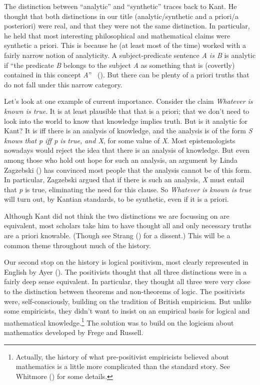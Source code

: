 \documentclass[
  10pt,
  letterpaper,
  DIV=11,
  numbers=noendperiod,
  twoside]{scrartcl}
\begin{document}
The distinction between ``analytic'' and ``synthetic'' traces back to
Kant. He thought that both distinctions in our title (analytic/synthetic
and a priori/a posteriori) were real, and that they were not the same
distinction. In particular, he held that most interesting philosophical
and mathematical claims were synthetic a priori. This is because he (at
least most of the time) worked with a fairly narrow notion of
analyticity. A subject-predicate sentence \emph{A is B} is analytic if
``the predicate \emph{B} belongs to the subject \emph{A} as something
that is (covertly) contained in this concept \emph{A}''
~(). But there
can be plenty of a priori truths that do not fall under this narrow
category.

Let's look at one example of current importance. Consider the claim
\emph{Whatever is known is true}. It is at least plausible that that is
a priori; that we don't need to look into the world to know that
knowledge implies truth. But is it analytic for Kant? It is iff there is
an analysis of knowledge, and the analysis is of the form \emph{S knows
that p iff p is true, and X}, for some value of \emph{X}. Most
epistemologists nowadays would reject the idea that there is an analysis
of knowledge. But even among those who hold out hope for such an
analysis, an argument by Linda Zagzebski
() has convinced most people that the
analysis cannot be of this form. In particular, Zagzebski argued that if
there is such an analysis, \emph{X} must entail that \emph{p} is true,
eliminating the need for this clause. So \emph{Whatever is known is
true} will turn out, by Kantian standards, to be synthetic, even if it
is a priori.

Although Kant did not think the two distinctions we are focussing on are
equivalent, most scholars take him to have thought all and only
necessary truths are a priori knowable. (Though see Strang
() for a dissent.) This will be a common
theme throughout much of the history.

Our second stop on the history is logical positivism, most clearly
represented in English by Ayer (). The
positivists thought that all three distinctions were in a fairly deep
sense equivalent. In particular, they thought all three were very close
to the distinction between theorems and non-theorems of logic. The
positivists were, self-consciously, building on the tradition of British
empiricism. But unlike some empiricists, they didn't want to insist on
an empirical basis for logical and mathematical knowledge.\footnote{Actually,
  the history of what pre-positivist empiricists believed about
  mathematics is a little more complicated than the standard story. See
  Whitmore () for some details.} The
solution was to build on the logicism about mathematics developed by
Frege and Russell.
\end{document}
